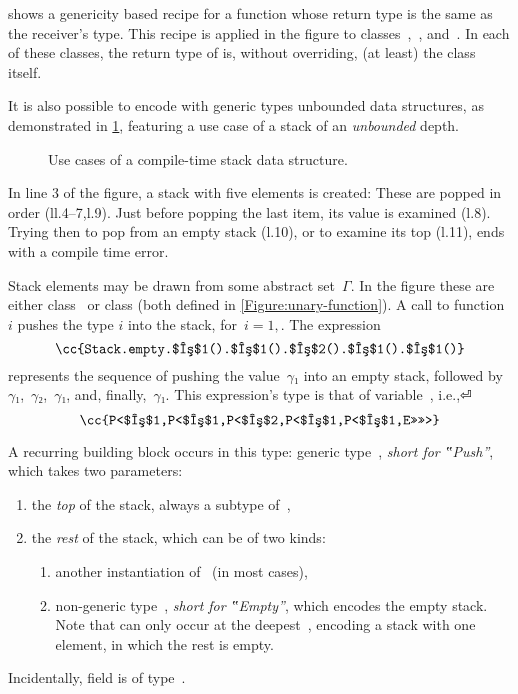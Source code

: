  shows a genericity based recipe for
  a function whose return type
  is the same as the receiver's type.
  This recipe is applied in the figure to classes~,~, and~.
  In each of these classes, the return type of  is,
  without overriding, (at least) the class itself.

It is also possible to encode with \Java generic types
  unbounded data structures, 
  as demonstrated in \cref{Figure:stack-use-cases},
  featuring a use case of a stack of an \emph{unbounded} depth.
\vspace{2ex}

\begin{figure}[H]
  \caption{\label{Figure:stack-use-cases}%
    Use cases of a compile-time stack data structure.
  }
\end{figure}

In line 3 of the figure, a stack with five elements is created:
These are popped in order (ll.4--7,l.9).
Just before popping the last item, its value is examined (l.8).
Trying then to pop from an empty stack (l.10), or to examine its top (l.11), ends with
  a compile time error.

Stack elements may be drawn from some abstract set~$Γ$.
In the figure these are either class~
or class  (both defined in \cref{Figure:unary-function}).
A call to function $i$ pushes the type $i$
  into the stack, for~$i=1,$.
The expression
\[
  \cc{Stack.empty.$γ$1().$γ$1().$γ$2().$γ$1().$γ$1()}
\]
represents the sequence of pushing the value~$γ₁$ into an
empty stack, followed by~$γ₁$,~$γ₂$,~$γ₁$, and, finally,~$γ₁$.
This expression's type is that of variable~, i.e.,⏎
\[
 \cc{P<$γ$1,P<$γ$1,P<$γ$2,P<$γ$1,P<$γ$1,E>>>>>}
\]

A recurring building block occurs in this type: 
  generic type~, \emph{short for ‟Push”}, which takes two parameters:
  \begin{enumerate}
    \item the \emph{top} of the stack, always a subtype of~,
    \item the \emph{rest} of the stack, which can be of two kinds:
          \begin{enumerate}
            \item another instantiation of~ (in most cases),
            \item non-generic type~, \emph{short for ‟Empty”}, which encodes the empty
              stack. Note that  can only occur at the deepest~, encoding a stack 
              with one element, in which the rest is empty. 
          \end{enumerate} %
  \end{enumerate}
Incidentally,  field  is of type~.

